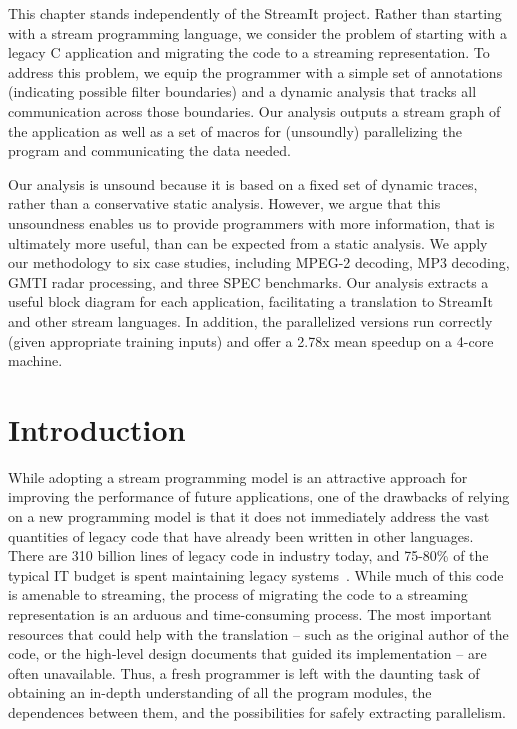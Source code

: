 \newcommand{\meanspeedup}[0]{2.78x}

\label{chap:profiling}

This chapter stands independently of the StreamIt project.  Rather
than starting with a stream programming language, we consider the
problem of starting with a legacy C application and migrating the code
to a streaming representation.  To address this problem, we equip the
programmer with a simple set of annotations (indicating possible
filter boundaries) and a dynamic analysis that tracks all
communication across those boundaries.  Our analysis outputs a stream
graph of the application as well as a set of macros for (unsoundly)
parallelizing the program and communicating the data needed.

Our analysis is unsound because it is based on a fixed set of dynamic
traces, rather than a conservative static analysis.  However, we argue
that this unsoundness enables us to provide programmers with more
information, that is ultimately more useful, than can be expected from
a static analysis.  We apply our methodology to six case studies,
including MPEG-2 decoding, MP3 decoding, GMTI radar processing, and
three SPEC benchmarks.  Our analysis extracts a useful block diagram
for each application, facilitating a translation to StreamIt and other
stream languages.  In addition, the parallelized versions run
correctly (given appropriate training inputs) and offer a
{\meanspeedup} mean speedup on a 4-core machine.

\section{Introduction}

While adopting a stream programming model is an attractive approach
for improving the performance of future applications, one of the
drawbacks of relying on a new programming model is that it does not
immediately address the vast quantities of legacy code that have
already been written in other languages.  There are 310 billion lines
of legacy code in industry today, and 75-80\% of the typical IT budget
is spent maintaining legacy systems~\cite{legacy}.  While much of this
code is amenable to streaming, the process of migrating the code to a
streaming representation is an arduous and time-consuming process.
The most important resources that could help with the translation --
such as the original author of the code, or the high-level design
documents that guided its implementation -- are often unavailable.
Thus, a fresh programmer is left with the daunting task of obtaining
an in-depth understanding of all the program modules, the dependences
between them, and the possibilities for safely extracting parallelism.

